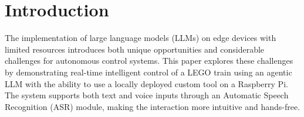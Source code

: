 \chapter{Introduction}
\label{ch:intro}



The implementation of large language models (LLMs) on edge devices with limited resources introduces both unique opportunities and considerable challenges for autonomous control systems. This paper explores these challenges by demonstrating real-time intelligent control of a LEGO train using an agentic LLM with the ability to use a locally deployed custom tool on a Raspberry Pi. The system supports both text and voice inputs through an Automatic Speech Recognition (ASR) module, making the interaction more intuitive and hands-free.

